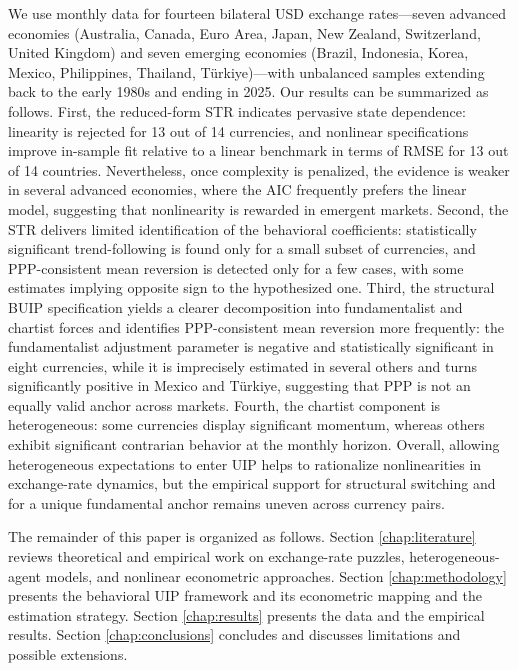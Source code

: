 \documentclass[a4paper,10pt,final]{article}    %
\begin{document}
We use monthly data for fourteen bilateral USD exchange rates—seven advanced economies (Australia, Canada, Euro Area, Japan, New Zealand, Switzerland, United Kingdom) and seven emerging economies (Brazil, Indonesia, Korea, Mexico, Philippines, Thailand, Türkiye)—with unbalanced samples extending back to the early 1980s and ending in 2025. Our results can be summarized as follows. First, the reduced-form STR indicates pervasive state dependence: linearity is rejected for 13 out of 14 currencies, and nonlinear specifications improve in-sample fit relative to a linear benchmark in terms of RMSE for 13 out of 14 countries. Nevertheless, once complexity is penalized, the evidence is weaker in several advanced economies, where the AIC frequently prefers the linear model, suggesting that nonlinearity is rewarded in emergent markets. Second, the STR delivers limited identification of the behavioral coefficients: statistically significant trend-following is found only for a small subset of currencies, and PPP-consistent mean reversion is detected only for a few cases, with some estimates implying opposite sign to the hypothesized one. Third, the structural BUIP specification yields a clearer decomposition into fundamentalist and chartist forces and identifies PPP-consistent mean reversion more frequently: the fundamentalist adjustment parameter is negative and statistically significant in eight currencies, while it is imprecisely estimated in several others and turns significantly positive in Mexico and T\"urkiye, suggesting that PPP is not an equally valid anchor across markets. Fourth, the chartist component is heterogeneous: some currencies display significant momentum, whereas others exhibit significant contrarian behavior at the monthly horizon. Overall, allowing heterogeneous expectations to enter UIP helps to rationalize nonlinearities in exchange-rate dynamics, but the empirical support for structural switching and for a unique fundamental anchor remains uneven across currency pairs.

The remainder of this paper is organized as follows. Section \ref{chap:literature} reviews theoretical and empirical work on exchange-rate puzzles, heterogeneous-agent models, and nonlinear econometric approaches. Section \ref{chap:methodology} presents the behavioral UIP framework and its econometric mapping and the estimation strategy. Section \ref{chap:results} presents the data and the empirical results. Section \ref{chap:conclusions} concludes and discusses limitations and possible extensions.
\end{document}
